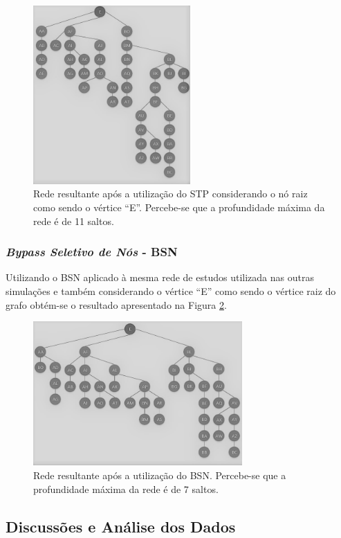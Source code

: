 \documentclass[12pt]{article}
\begin{document}
\begin{figure}[ht] %
	\centering
	\includegraphics[width=6cm]{Otimizada_STP_PB}
	\caption{Rede resultante após a utilização do STP considerando o nó raiz como sendo o vértice ``E''. Percebe-se que a profundidade máxima da rede é de 11 saltos.}
	\label{fig_rede_otimizada_STP}
\end{figure}

\subsubsection{\emph{Bypass Seletivo de Nós} - BSN}
Utilizando o BSN aplicado à mesma rede de estudos utilizada nas outras simulações e também considerando o vértice ``E'' como sendo o vértice raiz do grafo obtém-se o resultado apresentado na Figura \ref{fig_rede_otimizada_BSN}.

\begin{figure}[ht] %
	\centering
	\includegraphics[width=8cm]{Otimizada_BSN_PB}
	\caption{Rede resultante após a utilização do BSN. Percebe-se que a profundidade máxima da rede é de 7 saltos.}
	\label{fig_rede_otimizada_BSN}
\end{figure}



\subsection{Discussões e Análise dos Dados}
\end{document}
